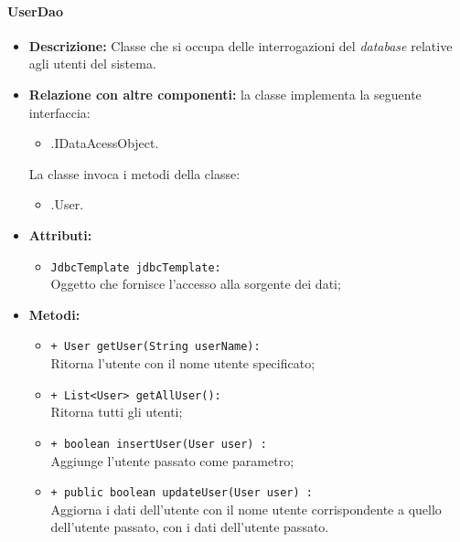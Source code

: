 \paragraph{UserDao}
\label{userdao}
\begin{flushleft}
\begin{itemize}
\item \textbf{Descrizione:} Classe che si occupa delle interrogazioni del \textit{database} relative agli utenti del sistema.
\item \textbf{Relazione con altre componenti:} la classe implementa la seguente interfaccia:
		\begin{itemize}
			\item \smodel{}.IDataAcessObject.
		\end{itemize}
		La classe invoca i metodi della classe:
		\begin{itemize}
			\item \smodel{}.User.
		\end{itemize}
\item \textbf{Attributi:}
\begin{sloppypar}
\begin{itemize}
\item \texttt{JdbcTemplate jdbcTemplate:}\\ Oggetto che fornisce l'accesso alla sorgente dei dati;
\end{itemize}
\end{sloppypar}
\item \textbf{Metodi:}
\begin{sloppypar}
\begin{itemize}
\item \texttt{+ User getUser(String userName):}\\ Ritorna l’utente con il nome utente specificato; 
\item \texttt{+ List<User> getAllUser():}\\ Ritorna tutti gli utenti;
\item \texttt{+ boolean insertUser(User user) :}\\ Aggiunge l'utente passato come parametro;
\item \texttt{+ public boolean updateUser(User user) :}\\ Aggiorna i dati dell'utente con il nome utente corrispondente a quello dell'utente passato, con i dati dell'utente passato.
\end{itemize}
\end{sloppypar}
\end{itemize}
\end{flushleft}

